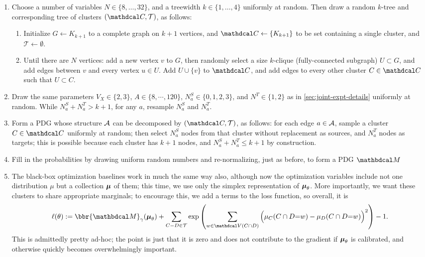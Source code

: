 \begin{subappendices}
\begin{enumerate}
    \item Choose a number of variables $N \in \{ 8, \ldots, 32 \}$, and a treewidth $k \in \{1, \ldots, 4\}$ uniformly at random.
    Then draw a random $k$-tree and corresponding tree of clusters $(\C, \mathcal T)$, as follows:
    \begin{enumerate}
        \item Initialize $G \gets K_{k+1}$ to a complete graph on $k+1$ vertices, and $\C \gets\{ K_{k+1} \}$ to be set containing a single cluster, and $\mathcal T\gets \emptyset$.
        \item Until there are $N$ vertices: add a new vertex $v$ to $G$, then randomly select a size $k$-clique (fully-connected subgraph) $U \subset G$, and add edges between $v$ and every vertex $u \in U$.
        Add $U \cup \{v\}$ to $\C$, and add edges to every other cluster $C \in \C$ such that $U \subset C$.
    \end{enumerate}
    \item Draw the same parameters $V_X \in \{2,3\}$, $A \in \{8, \cdots, 120\}$, $N_a^S \in \{0,1,2,3\}$, and $N^{T}\in \{1,2\}$
    as in \cref{sec:joint-expt-details} uniformly at random.
    While $N_a^S + N^T_a > k+1$, for any $a$, resample $N_a^S$ and $N_a^T$.

    \item Form a PDG whose structure $\mathcal A$ can be decomposed by $(\C, \cal T)$, as follows:
    for each edge $a \in \mathcal A$, sample a cluster $C \in \C$ uniformly at random; then select $N_a^S$ nodes from that cluster without replacement as sources, and $N_a^T$ nodes as targets; this is possible because each cluster has $k+1$ nodes, and $N_a^S + N_a^T \le k+1$ by construction.
    \item Fill in the probabilities by drawing uniform random numbers and re-normalizing, just as before, to form a PDG $\dg M$

    \item The black-box optimization baselines work in much the same way also, although now the optimization variables include not one distribution $\mu$ but a collection $\boldsymbol\mu$ of them;
    this time, we use only the simplex representation of $\boldsymbol\mu_\theta$.
    More importantly, we want these clusters to share appropriate marginals; to encourage this, we add a terms to the loss function, so overall, it is
    \[
        \ell(\theta) := \bbr{\dg M}_{\gamma}(\bmu_{\theta}) + \sum_{C{-}D \in \mathcal T} \exp \left(\sum_{w \in \V(C\cap D)} \Big(\mu_C(C\cap D{=}w) - \mu_D(C \cap D {=}w)\Big)^2 \right) - 1.
    \]
    This is admittedly pretty ad-hoc; the point is just that it is zero and does not contribute to the gradient if $\boldsymbol\mu_\theta$ is calibrated, and otherwise quickly becomes overwhelmingly important.
\end{enumerate}


\end{subappendices}

